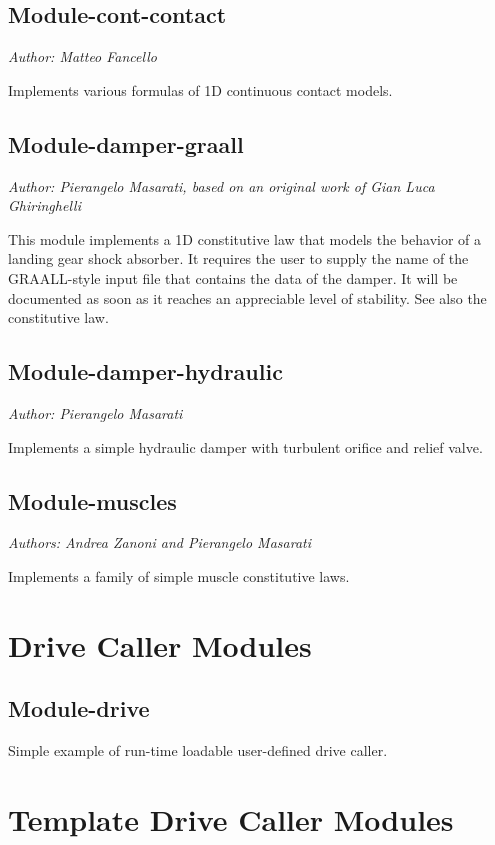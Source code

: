 \subsection{Module-cont-contact}
\emph{Author: Matteo Fancello}

\noindent
Implements various formulas of 1D continuous contact models.

\subsection{Module-damper-graall}
\emph{Author: Pierangelo Masarati, based on an original work of Gian Luca Ghiringhelli}

This module implements a 1D constitutive law that models
the behavior of a landing gear shock absorber.
It requires the user to supply the name of the GRAALL-style 
input file that contains the data of the damper.
It will be documented as soon as it reaches an appreciable level
of stability.
See also the 
constitutive law.

\subsection{Module-damper-hydraulic}
\emph{Author: Pierangelo Masarati}

\noindent
Implements a simple hydraulic damper with turbulent orifice and relief valve.

\subsection{Module-muscles}
\emph{Authors: Andrea Zanoni and Pierangelo Masarati}

\noindent
Implements a family of simple muscle constitutive laws.



\section{Drive Caller Modules}

\subsection{Module-drive}
Simple example of run-time loadable user-defined drive caller.



\section{Template Drive Caller Modules}

